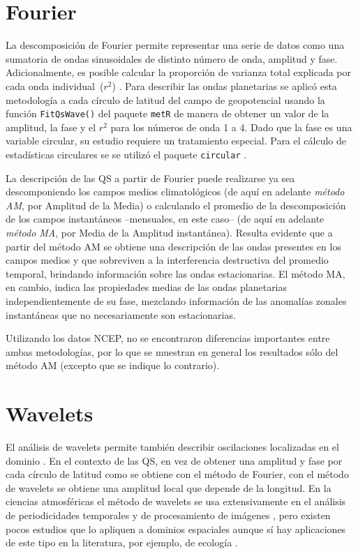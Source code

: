\documentclass[spanish,a4paper,12pt,oneside]{book}
\begin{document}
\section*{Fourier}

La descomposición de Fourier permite representar una serie de datos como
una sumatoria de ondas sinusoidales de distinto número de onda, amplitud
y fase. Adicionalmente, es posible calcular la proporción de varianza
total explicada por cada onda individual~(\(r^2\)) \citep{Wilks2011}.
Para describir las ondas planetarias se aplicó esta metodología a cada
círculo de latitud del campo de geopotencial usando la función
\texttt{FitQsWave()} del paquete \texttt{metR} \citep{R-metR} de manera
de obtener un valor de la amplitud, la fase y el \(r^2\) para los
números de onda 1 a 4. Dado que la fase es una variable circular, su
estudio requiere un tratamiento especial. Para el cálculo de
estadísticas circulares se se utilizó el paquete \texttt{circular}
\citep{R-circular}.

La descripción de las QS a partir de Fourier puede realizarse ya sea
descomponiendo los campos medios climatológicos (de aquí en adelante
\emph{método AM}, por Amplitud de la Media) o calculando el promedio de
la descomposición de los campos instantáneos --mensuales, en este caso--
(de aquí en adelante \emph{método MA}, por Media de la Amplitud
instantánea). Resulta evidente que a partir del método AM se obtiene una
descripción de las ondas presentes en los campos medios y que sobreviven
a la interferencia destructiva del promedio temporal, brindando
información sobre las ondas estacionarias. El método MA, en cambio,
indica las propiedades medias de las ondas planetarias
independientemente de su fase, mezclando información de las anomalías
zonales instantáneas que no necesariamente son estacionarias.

Utilizando los datos NCEP, no se encontraron diferencias importantes
entre ambas metodologías, por lo que se muestran en general los
resultados sólo del método AM (excepto que se indique lo contrario).

\section*{Wavelets}

El análisis de wavelets permite también describir oscilaciones
localizadas en el dominio \citep{Torrence1998}. En el contexto de las
QS, en vez de obtener una amplitud y fase por cada círculo de latitud
como se obtiene con el método de Fourier, con el método de wavelets se
obtiene una amplitud local que depende de la longitud. En la ciencias
atmosféricas el método de wavelets se usa extensivamente en el análisis
de periodicidades temporales \citep[ej.][]{Raphael2004, Kinnard2011} y
de procesamiento de imágenes \citep[ej.][]{Desrochers1999}, pero existen
pocos estudios que lo apliquen a dominios espaciales
\citep[ej.][]{Pinault2016} aunque sí hay aplicaciones de este tipo en la
literatura, por ejemplo, de ecología \citep[ej,][]{Mi2005}.
\end{document}
